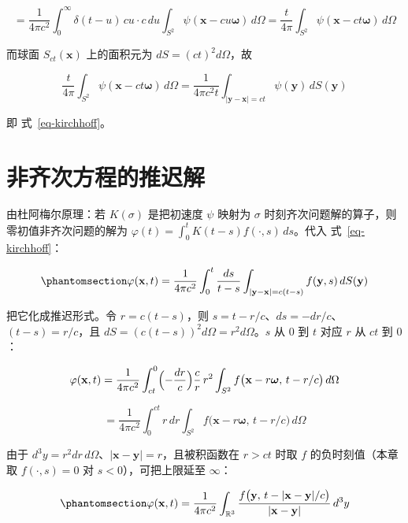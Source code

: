 \documentclass[
  chinese,
  a4paper,
  UTF8,
  12pt,
  oneside,
  openany]{ctexbook}
\theoremstyle{plain}
\theoremstyle{plain}
\theoremstyle{plain}
\theoremstyle{definition}
\theoremstyle{plain}
\theoremstyle{plain}
\theoremstyle{remark}
\begin{document}
\[
=\frac{1}{4\pi c^{2}}\int_{0}^{\infty}\delta(t-u)\,cu\cdot c\,du\int_{S^{2}}\psi(\mathbf{x}-cu\boldsymbol{\omega})\,d\Omega
=\frac{t}{4\pi}\int_{S^{2}}\psi(\mathbf{x}-ct\boldsymbol{\omega})\,d\Omega
\]

而球面 \(S_{ct}(\mathbf{x})\) 上的面积元为 \(dS=(ct)^{2}d\Omega\)，故

\[
\frac{t}{4\pi}\int_{S^{2}}\psi(\mathbf{x}-ct\boldsymbol{\omega})\,d\Omega
=\frac{1}{4\pi c^{2}t}\int_{|\mathbf{y}-\mathbf{x}|=ct}\psi(\mathbf{y})\,dS(\mathbf{y})
\]

即 式~\ref{eq-kirchhoff}。

\section{非齐次方程的推迟解}\label{sec-tsf-retarded}

由杜阿梅尔原理：若 \(K(\sigma)\) 是把初速度 \(\psi\) 映射为 \(\sigma\)
时刻齐次问题解的算子，则零初值非齐次问题的解为
\(\varphi(t)=\int_{0}^{t}K(t-s)f(\cdot,s)\,ds\)。代入
式~\ref{eq-kirchhoff}：

\begin{equation}\protect\phantomsection\label{eq-duhamel}{
\varphi(\mathbf{x},t)=\frac{1}{4\pi c^{2}}\int_{0}^{t}\frac{ds}{t-s}
\int_{|\mathbf{y}-\mathbf{x}|=c(t-s)}f(\mathbf{y},s)\,dS(\mathbf{y})
}\end{equation}

把它化成推迟形式。令 \(r=c(t-s)\)，则
\(s=t-r/c\)、\(ds=-dr/c\)、\((t-s)=r/c\)，且
\(dS=(c(t-s))^{2}d\Omega=r^{2}d\Omega\)。\(s\) 从 \(0\) 到 \(t\) 对应
\(r\) 从 \(ct\) 到 \(0\)：

\[
\varphi(\mathbf{x},t)
=\frac{1}{4\pi c^{2}}\int_{ct}^{0}\Bigl(-\frac{dr}{c}\Bigr)\frac{c}{r}\,r^{2}
\int_{S^{2}}f\bigl(\mathbf{x}-r\boldsymbol{\omega},\,t-r/c\bigr)\,d\Omega
\]

\[
=\frac{1}{4\pi c^{2}}\int_{0}^{ct}r\,dr\int_{S^{2}}f\bigl(\mathbf{x}-r\boldsymbol{\omega},\,t-r/c\bigr)\,d\Omega
\]

由于
\(d^{3}y=r^{2}dr\,d\Omega\)、\(|\mathbf{x}-\mathbf{y}|=r\)，且被积函数在
\(r>ct\) 时取 \(f\) 的负时刻值（本章取 \(f(\cdot,s)=0\) 对
\(s<0\)），可把上限延至 \(\infty\)：

\begin{equation}\protect\phantomsection\label{eq-retarded}{
\varphi(\mathbf{x},t)=\frac{1}{4\pi c^{2}}\int_{\mathbb{R}^{3}}
\frac{f\bigl(\mathbf{y},\,t-|\mathbf{x}-\mathbf{y}|/c\bigr)}{|\mathbf{x}-\mathbf{y}|}\,d^{3}y
}\end{equation}
\end{document}
